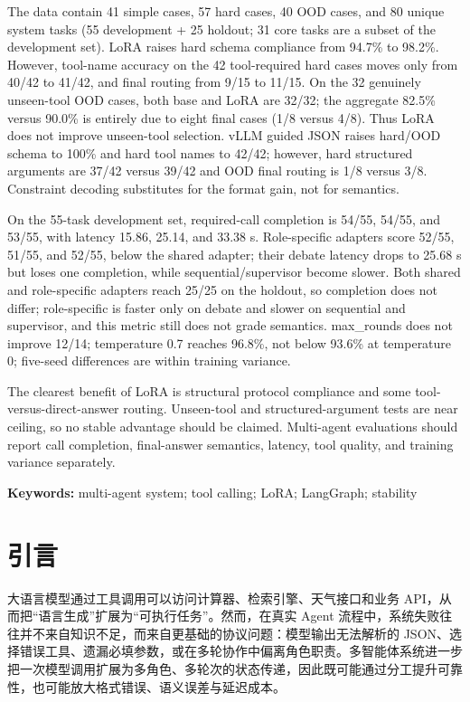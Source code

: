 \documentclass[UTF8,a4paper,12pt]{ctexart}
\begin{document}
The data contain 41 simple cases, 57 hard cases, 40 OOD cases, and 80 unique
system tasks (55 development + 25 holdout; 31 core tasks are a subset of the
development set). LoRA raises hard schema compliance from 94.7\% to 98.2\%.
However, tool-name accuracy on the 42 tool-required hard cases moves only from
40/42 to 41/42, and final routing from 9/15 to 11/15. On the 32 genuinely
unseen-tool OOD cases, both base and LoRA are 32/32; the aggregate 82.5\% versus
90.0\% is entirely due to eight final cases (1/8 versus 4/8). Thus LoRA does not
improve unseen-tool selection. vLLM guided JSON raises hard/OOD schema to 100\%
and hard tool names to 42/42; however, hard structured arguments are 37/42
versus 39/42 and OOD final routing is 1/8 versus 3/8. Constraint decoding
substitutes for the format gain, not for semantics.

On the 55-task development set, required-call completion is 54/55, 54/55, and
53/55, with latency 15.86, 25.14, and 33.38 s. Role-specific adapters score
52/55, 51/55, and 52/55, below the shared adapter; their debate latency drops to
25.68 s but loses one completion, while sequential/supervisor become slower.
Both shared and role-specific adapters reach 25/25 on the holdout, so completion
does not differ; role-specific is faster only on debate and slower on sequential
and supervisor, and this metric still does not grade semantics. max\_rounds does
not improve 12/14; temperature 0.7 reaches 96.8\%, not below 93.6\% at
temperature 0; five-seed differences are within training variance.

The clearest benefit of LoRA is structural protocol compliance and some
tool-versus-direct-answer routing. Unseen-tool and structured-argument tests are
near ceiling, so no stable advantage should be claimed. Multi-agent evaluations
should report call completion, final-answer semantics, latency, tool quality,
and training variance separately.

\vspace{0.5em}
\noindent\textbf{Keywords:} multi-agent system; tool calling; LoRA; LangGraph;
stability

\clearpage
\tableofcontents
\clearpage
{}

\section{引言}
大语言模型通过工具调用可以访问计算器、检索引擎、天气接口和业务 API，从而把“语言生成”扩展为“可执行任务”。然而，在真实 Agent 流程中，系统失败往往并不来自知识不足，而来自更基础的协议问题：模型输出无法解析的 JSON、选择错误工具、遗漏必填参数，或在多轮协作中偏离角色职责。多智能体系统进一步把一次模型调用扩展为多角色、多轮次的状态传递，因此既可能通过分工提升可靠性，也可能放大格式错误、语义误差与延迟成本。
\end{document}
